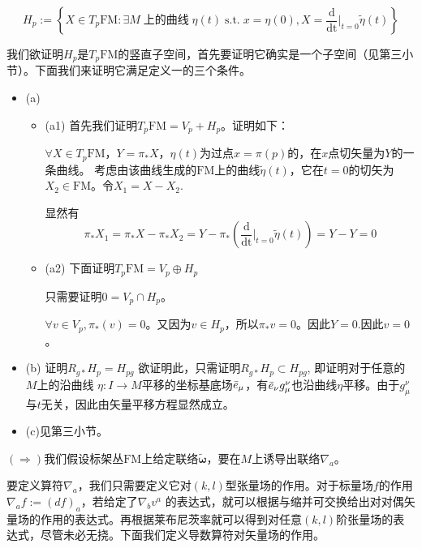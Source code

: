 \documentclass{ctexbook}
\begin{document}
\begin{equation}
    H_p:=\left\{X\in T_p\mathrm{FM}:\exists M\;\text{上的曲线}\;\eta(t)\;\text{s.t.}\;x=\eta(0),X=\frac{\mathrm{d}}{\mathrm{dt}}|_{t=0}\tilde{\eta}(t)\right\}
\end{equation}

我们欲证明$H_p$是$T_p\mathrm{FM}$的竖直子空间，首先要证明它确实是一个子空间（见第三小节）。下面我们来证明它满足定义一的三个条件。

\begin{itemize}
    \item (a) 
        \begin{itemize}
            \item (a1) 首先我们证明$T_p\mathrm{FM}=V_p+ H_p$。证明如下：
            
            $\forall X\in T_p\mathrm{FM}$，$Y=\pi_{*}X$，$\eta(t)$为过点$x=\pi(p)$的，在$x$点切矢量为$Y$的一条曲线。   考虑由该曲线生成的$\mathrm{FM}$上的曲线$\tilde{\eta}(t)$，它在$t=0$的切矢为$X_2\in\mathrm{FM}$。令$X_1=X-X_2$.
            
            显然有
            \begin{equation}
                \pi_{*}X_1=\pi_{*}X-\pi_{*}X_2=Y - \pi_{*}(\frac{\mathrm{d}}{\mathrm{dt}}|_{t=0}\tilde{\eta}(t))=Y-Y=0  
            \end{equation}
            
            \item (a2) 下面证明$T_p\mathrm{FM}=V_p\oplus H_p$
            
            只需要证明${0}=V_p\cap H_p$。
            
            $\forall v\in V_p,\pi_{*}(v)=0$。又因为$v\in H_p$，所以$\pi_{*}v=0$。因此$Y=0$.因此$v=0$。
        \end{itemize}
    \item (b) 证明$R_{g*} H_p=H_{pg}$
    欲证明此，只需证明$R_{g*} H_p\subset H_{pg}$, 即证明对于任意的$M$上的沿曲线 $\eta\colon I\to M$平移的坐标基底场$\Bar{e}_{\mu}$，有$\Bar{e}_\nu g^{\nu}_{\mu}$也沿曲线$\eta$平移。由于$g^{\nu}_{\mu}$与$t$无关，因此由矢量平移方程显然成立。
    \item (c)见第三小节。
\end{itemize}

$\left(\Rightarrow\right)$我们假设标架丛$\mathrm{FM}$上给定联络$\tilde{\bm{\omega}}$，要在$M$上诱导出联络$\nabla_a$。

要定义算符$\nabla_a$，我们只需要定义它对$(k,l)$型张量场的作用。对于标量场$f$的作用$\nabla_a f:=(df)_a$，若给定了$\nabla_b v^{a}$ 的表达式，就可以根据与缩并可交换给出对对偶矢量场的作用的表达式。再根据莱布尼茨率就可以得到对任意$(k,l)$阶张量场的表达式，尽管未必无挠。下面我们定义导数算符对矢量场的作用。
\end{document}
